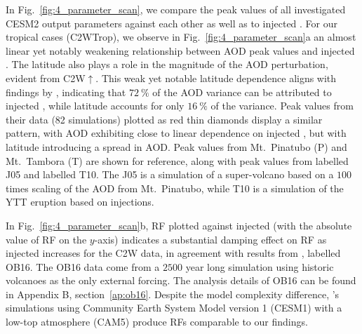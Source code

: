 \documentclass[draft]{agujournal2019}
\newcommand{\iso}[1][i]{{#1}njected \ce{SO2}}
\newcommand{\cw}{C2W}
\newcommand{\cwt}{C2WTrop}
\newcommand{\cwsn}{C2W\(\uparrow\)}
\begin{document}
In Fig.~\ref{fig:4_parameter_scan}, we compare the peak values of all investigated CESM2
output parameters against each other as well as to \iso{}. For our tropical cases
(\cwt{}), we observe in Fig.~\ref{fig:4_parameter_scan}a an almost linear yet notably
weakening relationship between AOD peak values and \iso{}. The latitude also plays a
role in the magnitude of the AOD perturbation, evident from \cwsn{}. This weak yet
notable latitude dependence aligns with findings by , indicating
that \(\SI{72}{\percent}\) of the AOD variance can be attributed to \iso{}, while
latitude accounts for only \(\SI{16}{\percent}\) of the variance. Peak values from their
data (82 simulations) plotted as red thin diamonds display a similar pattern, with AOD
exhibiting close to linear dependence on \iso{}, but with latitude introducing a spread
in AOD. Peak values from Mt.\ Pinatubo (P) and Mt.\ Tambora (T) are shown for reference,
along with peak values from  labelled J05 and 
labelled T10. The J05 is a simulation of a super-volcano based on a \(100\) times
scaling of the AOD from Mt.\ Pinatubo, while T10 is a simulation of the YTT eruption
based on  injections.

In Fig.~\ref{fig:4_parameter_scan}b, RF plotted against \iso{} (with the absolute value
of RF on the \(y\)-axis) indicates a substantial damping effect on RF as \iso{}
increases for the \cw{} data, in agreement with results from ,
labelled OB16. The OB16 data come from a \(2500\) year long simulation using historic
volcanoes as the only external forcing. The analysis details of OB16 can be found in
Appendix B, section~\ref{ap:ob16}. Despite the model complexity difference,
's simulations using Community Earth System Model version 1
(CESM1) with a low-top atmosphere (CAM5) produce RFs comparable to our findings.
\end{document}
